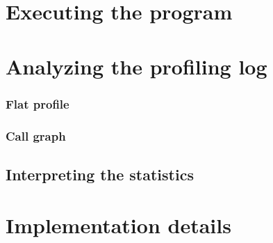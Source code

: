 \documentclass[twoside]{book}
\begin{document}
\chapter{Executing the program}

\chapter{Analyzing the profiling log}

\subsection{Flat profile}

\subsection{Call graph}



\section{Interpreting the statistics}

\chapter{Implementation details}

\listoftables
\listoffigures
\appendix                              %
\end{document}
